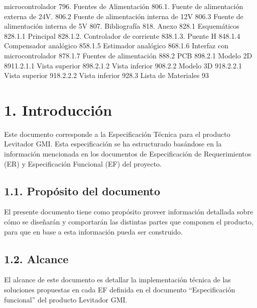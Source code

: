 \documentclass{article} %
\begin{document}
microcontrolador 796. Fuentes de Alimentaci\'{o}n 806.1. Fuente de alimentaci\'{o}n externa de 24V. 806.2 Fuente de alimentaci\'{o}n interna de 12V 806.3 Fuente de alimentaci\'{o}n interna de 5V 807. Bibliograf\'{i}a 818. Anexo 828.1  Esquem\'{a}ticos 828.1.1 Principal 828.1.2. Controlador de corriente 838.1.3. Puente H 848.1.4 Compensador anal\'{o}gico 858.1.5 Estimador anal\'{o}gico 868.1.6 Interfaz con microcontrolador 878.1.7 Fuentes de alimentaci\'{o}n 888.2 PCB 898.2.1 Modelo 2D 8911.2.1.1 Vista superior 898.2.1.2 Vista inferior 908.2.2 Modelo 3D 918.2.2.1 Vista superior 918.2.2.2 Vista inferior 928.3 Lista de Materiales 93

\noindent 

\noindent 

\noindent 
\section{\eject }

\noindent 
\section{1. Introducci\'{o}n}

\noindent Este documento corresponde a la Especificaci\'{o}n T\'{e}cnica para el producto Levitador GMI. Esta especificaci\'{o}n se ha estructurado bas\'{a}ndose en la informaci\'{o}n mencionada en los documentos de Especificaci\'{o}n de Requerimientos (ER) y Especificaci\'{o}n Funcional (EF) del proyecto.

\noindent 
\subsection{1.1. Prop\'{o}sito del documento}

\noindent El presente documento tiene como prop\'{o}sito proveer informaci\'{o}n detallada sobre c\'{o}mo se dise\~{n}ar\'{a}n y comportar\'{a}n las distintas partes que componen el producto, para que en base a esta informaci\'{o}n pueda ser construido.

\noindent 

\noindent 
\subsection{1.2. Alcance}

\noindent El alcance de este documento es detallar la implementaci\'{o}n t\'{e}cnica de las soluciones propuestas en cada EF definida en el documento ``Especificaci\'{o}n funcional'' del producto Levitador GMI.
\end{document}
